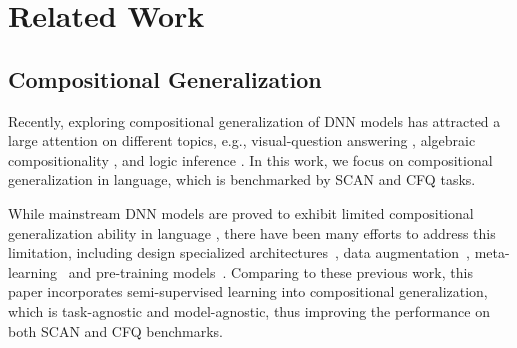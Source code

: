 \documentclass[letterpaper]{article} %
\begin{document}
\section{Related Work}

\subsection{Compositional Generalization}
\label{sec:related_cg}
Recently, exploring compositional generalization of DNN models has attracted a large attention on different topics, e.g., visual-question answering \cite{hudson2018compositional}, algebraic compositionality \cite{veldhoen2016diagnostic,saxton2018analysing}, and logic inference \cite{bowman2015tree,mul2019siamese}.
In this work, we focus on compositional generalization in language, which is benchmarked by SCAN \cite{lake2018generalization} and CFQ \cite{keysers2020measuring} tasks.

While mainstream DNN models are proved to exhibit limited compositional generalization ability in language \cite{lake2018generalization,hupkes2020compositionality,keysers2020measuring,furrer2020compositional}, there have been many efforts to address this limitation, including
design specialized architectures~\cite{russin2019compositional,li2019compositional,gordon2019permutation,guo2020hierarchical,liu2020compositional}, data augmentation~\cite{jia-liang-2016-data,andreas-2020-good}, meta-learning~\cite{lake2019compositional,nye2020learning} and pre-training models~\cite{furrer2020compositional}.
Comparing to these previous work, this paper incorporates semi-supervised learning into compositional generalization, which is task-agnostic and model-agnostic, thus improving the performance on both SCAN and CFQ benchmarks.
\end{document}

